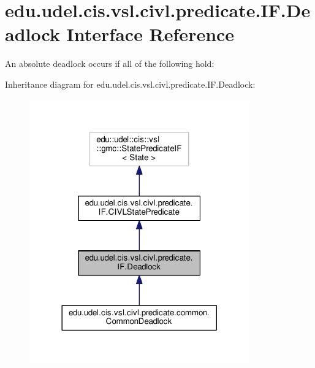 \hypertarget{interfaceedu_1_1udel_1_1cis_1_1vsl_1_1civl_1_1predicate_1_1IF_1_1Deadlock}{}\section{edu.\+udel.\+cis.\+vsl.\+civl.\+predicate.\+I\+F.\+Deadlock Interface Reference}
\label{interfaceedu_1_1udel_1_1cis_1_1vsl_1_1civl_1_1predicate_1_1IF_1_1Deadlock}


An absolute deadlock occurs if all of the following hold\+:  




Inheritance diagram for edu.\+udel.\+cis.\+vsl.\+civl.\+predicate.\+I\+F.\+Deadlock\+:
\nopagebreak
\begin{figure}[H]
\begin{center}
\leavevmode
\includegraphics[width=269pt]{interfaceedu_1_1udel_1_1cis_1_1vsl_1_1civl_1_1predicate_1_1IF_1_1Deadlock__inherit__graph}
\end{center}
\end{figure}


